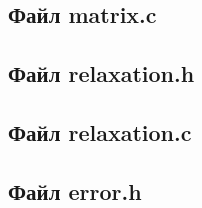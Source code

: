 \documentclass[a4paper,12pt,titlepage,finall]{article}
\begin{document}
\subsection{Файл matrix.c}

\subsection{Файл relaxation.h}

\subsection{Файл relaxation.c}

\subsection{Файл error.h}

\end{document}

